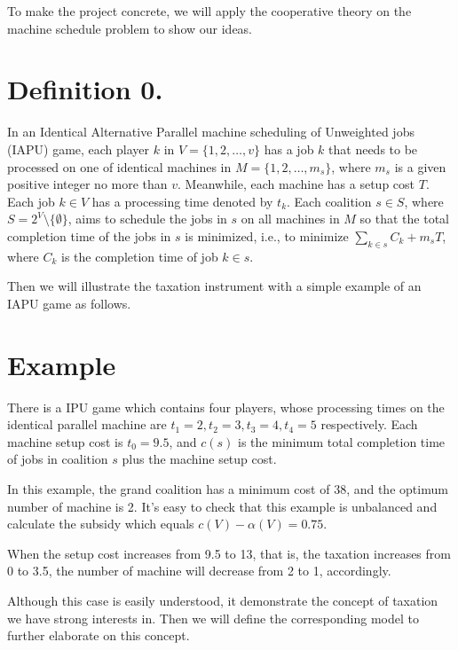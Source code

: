 \documentclass[UTF8]{article}
\begin{document}
To make the project concrete, we will apply the cooperative theory on the machine schedule problem to show our ideas.



\section*{Definition 0.}
In an Identical Alternative Parallel machine scheduling of Unweighted jobs (IAPU) game, each player $k$ in $V=\{1,2,\ldots,v\}$ has a job $k$ that needs to be processed on one of identical machines in $M=\{1,2,\ldots,m_s\}$, where $m_s$ is a given positive integer no more than $v$. Meanwhile, each machine has a setup cost $T$. Each job $k\in V$ has a processing time denoted by $t_k$. Each coalition $s \in S$, where $S=2^V\setminus\{\emptyset\}$, aims to schedule the jobs in $s$ on all machines in $M$ so that the total completion  time of the jobs in $s$ is minimized, i.e., to minimize $\sum_{k\in s}{C_k}+m_sT $,
where $C_k$ is the completion time of job $k\in s$.


Then we will illustrate the taxation instrument with a simple example of an IAPU game as follows.

\section*{Example}

There is a IPU game which contains four players, whose processing times on the identical parallel machine are $t_1=2,t_2=3,t_3=4,t_4=5$ respectively. Each machine setup cost is $t_0=9.5$, and $c(s)$ is the minimum total completion time of jobs in coalition $s$ plus the machine setup cost.

In this example, the grand coalition has a minimum cost of 38, and the optimum number of machine is 2.
It's easy to check that this example is unbalanced and calculate the subsidy which equals $ c(V) - \alpha(V) = 0.75$.

When the setup cost increases from 9.5 to 13, that is, the taxation increases from 0 to 3.5,
the number of machine will decrease from 2 to 1, accordingly.

Although this case is easily understood, it demonstrate the concept of taxation we have strong interests in. Then we will define the corresponding model to further elaborate on this concept.
\end{document}
